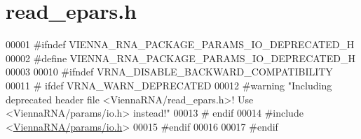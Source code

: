 \hypertarget{read__epars_8h_source}{}\section{read\+\_\+epars.\+h}
\label{read__epars_8h_source}

\begin{DoxyCode}
00001 \textcolor{preprocessor}{#ifndef VIENNA\_RNA\_PACKAGE\_PARAMS\_IO\_DEPRECATED\_H}
00002 \textcolor{preprocessor}{#define VIENNA\_RNA\_PACKAGE\_PARAMS\_IO\_DEPRECATED\_H}
00003 
00010 \textcolor{preprocessor}{#ifndef VRNA\_DISABLE\_BACKWARD\_COMPATIBILITY}
00011 \textcolor{preprocessor}{# ifdef VRNA\_WARN\_DEPRECATED}
00012 \textcolor{preprocessor}{#warning "Including deprecated header file <ViennaRNA/read\_epars.h>! Use <ViennaRNA/params/io.h> instead!"}
00013 \textcolor{preprocessor}{# endif}
00014 \textcolor{preprocessor}{#include <\hyperlink{io_8h}{ViennaRNA/params/io.h}>}
00015 \textcolor{preprocessor}{#endif}
00016 
00017 \textcolor{preprocessor}{#endif}
\end{DoxyCode}
